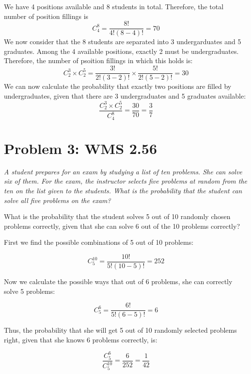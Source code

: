 \documentclass{article}
\begin{document}
	\begin{sol}
		We have 4 positions available and 8 students in total. Therefore, the total number of position fillings is
		$$ C_4^8 = \frac{8!}{4! (8-4)!} = 70$$
		We now consider that the 8 students are separated into 3 undergarduates and 5 graduates. Among the 4 available positions, exactly 2 must be undergraduates. Therefore, the number of psoition fillings in which this holds is:
		$$ C_2^3 \times C_2^5 = \frac{3!}{2! (3-2)!} \times  \frac{5!}{2!(5-2)!} = 30$$
		We can now calculate the probability that exactly two positions are filled by undergraduates, given that there are 3 undergraduates and 5 graduates available:
		$$ \frac{C_2^3 \times C_2^5}{C_4^8} = \frac{30}{70} = \boxed{\frac37}$$
		
	\end{sol}

\pagebreak

\section*{Problem 3: WMS 2.56}
	\emph{A student prepares for an exam by studying a list of ten problems. She can solve six of them. For the exam, the instructor selects five problems at random from the ten on the list given to the students. What is the probability that the student can solve all five problems on the exam?}
	\begin{sol}
		What is the probability that the student solves 5 out of 10 randomly chosen problems correctly, given that she can solve 6 out of the 10 problems correctly?
		
		First we find the possible combinations of 5 out of 10 problems:
		
		$$	C_5^{10} = \frac{10!}{5! (10-5)!} = 252$$
		
		Now we calculate the possible ways that out of 6 problems, she can correctly solve 5 problems:
		
		$$ C_5^6 = \frac{6!}{5! (6-5)!} = 6$$
		
		Thus, the probability that she will get 5 out of 10 randomly selected problems right, given that she knows 6 problems correctly, is:
		
		$$ \frac{C_5^6}{C_5^{10}} = \frac{6}{252} = \boxed{\frac{1}{42}}$$
	\end{sol}	

\pagebreak
\end{document}

